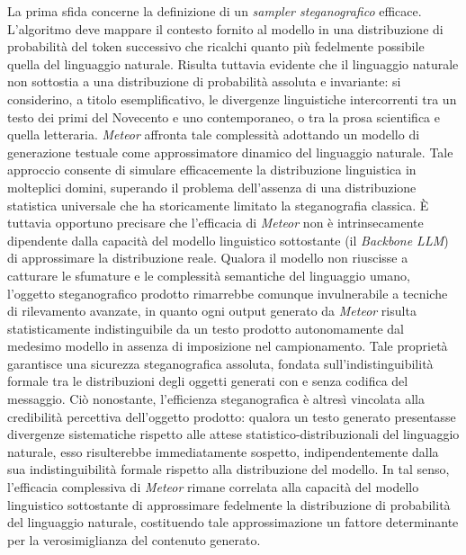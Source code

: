 La prima sfida concerne la definizione di un \emph{sampler steganografico} efficace. L'algoritmo deve mappare il contesto fornito al modello in una distribuzione di probabilità del token successivo che ricalchi quanto più fedelmente possibile quella del linguaggio naturale. Risulta tuttavia evidente che il linguaggio naturale non sottostia a una distribuzione di probabilità assoluta e invariante: si considerino, a titolo esemplificativo, le divergenze linguistiche intercorrenti tra un testo dei primi del Novecento e uno contemporaneo, o tra la prosa scientifica e quella letteraria. \emph{Meteor} affronta tale complessità adottando un modello di generazione testuale come approssimatore dinamico del linguaggio naturale. Tale approccio consente di simulare efficacemente la distribuzione linguistica in molteplici domini, superando il problema dell'assenza di una distribuzione statistica universale che ha storicamente limitato la steganografia classica. È tuttavia opportuno precisare che l'efficacia di \emph{Meteor} non è intrinsecamente dipendente dalla capacità del modello linguistico sottostante (il \emph{Backbone LLM}) di approssimare la distribuzione reale. Qualora il modello non riuscisse a catturare le sfumature e le complessità semantiche del linguaggio umano, l'oggetto steganografico prodotto rimarrebbe comunque invulnerabile a tecniche di rilevamento avanzate, in quanto ogni output generato da \emph{Meteor} risulta statisticamente indistinguibile da un testo prodotto autonomamente dal medesimo modello in assenza di imposizione nel campionamento. Tale proprietà garantisce una sicurezza steganografica assoluta, fondata sull'indistinguibilità formale tra le distribuzioni degli oggetti generati con e senza codifica del messaggio. Ciò nonostante, l'efficienza steganografica è altresì vincolata alla credibilità percettiva dell'oggetto prodotto: qualora un testo generato presentasse divergenze sistematiche rispetto alle attese statistico-distribuzionali del linguaggio naturale, esso risulterebbe immediatamente sospetto, indipendentemente dalla sua indistinguibilità formale rispetto alla distribuzione del modello. In tal senso, l'efficacia complessiva di \emph{Meteor} rimane correlata alla capacità del modello linguistico sottostante di approssimare fedelmente la distribuzione di probabilità del linguaggio naturale, costituendo tale approssimazione un fattore determinante per la verosimiglianza del contenuto generato.

